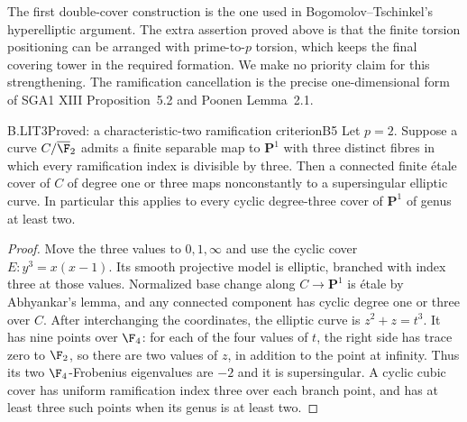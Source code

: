 The first double-cover construction is the one used in
Bogomolov--Tschinkel's hyperelliptic argument. The extra assertion
proved above is that the finite torsion positioning can be arranged
with prime-to-$p$ torsion, which keeps the final covering tower in
the required formation. We make no priority claim for this
strengthening. The ramification cancellation is the precise
one-dimensional form of SGA1 XIII Proposition~5.2 and Poonen
Lemma~2.1.\citep{LA_BogomolovTschinkel2002,LA_Poonen2005,LA_SGA1}

\begin{claim}{B.LIT3}{Proved: a characteristic-two ramification criterion}{B5}
Let $p=2$. Suppose a curve $C/\overline{\F}_2$ admits a finite
separable map to $\mathbf P^1$ with three distinct fibres in which
every ramification index is divisible by three. Then a connected
finite \'etale cover of $C$ of degree one or three maps nonconstantly
to a supersingular elliptic curve. In particular this applies to
every cyclic degree-three cover of $\mathbf P^1$ of genus at least
two.
\end{claim}
\begin{proof}
Move the three values to $0,1,\infty$ and use the cyclic cover
$E:y^3=x(x-1)$. Its smooth projective model is elliptic, branched
with index three at those values. Normalized base change along
$C\to\mathbf P^1$ is \'etale by Abhyankar's lemma, and any
connected component has cyclic degree one or three over $C$.
After interchanging the coordinates, the elliptic curve is
$z^2+z=t^3$. It has nine points over $\F_4$: for each of the four
values of $t$, the right side has trace zero to $\F_2$, so there
are two values of $z$, in addition to the point at infinity.
Thus its two $\F_4$-Frobenius eigenvalues are $-2$ and it is
supersingular. A cyclic cubic cover has uniform ramification
index three over each branch point, and has at least three such
points when its genus is at least two.
\end{proof}

